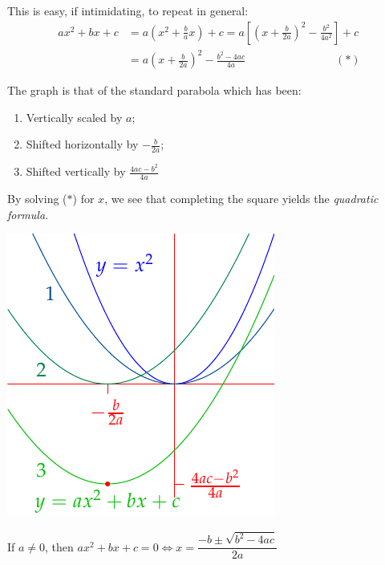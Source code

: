 This is easy, if intimidating, to repeat in general:
\begin{align*}
	ax^2+bx+c&=a\left(x^2+\frac ba x\right)+c =a\left[\left(x+\frac b{2a}\right)^2-\frac{b^2}{4a^2}\right]+c\\
	&=a\left(x+\frac b{2a}\right)^2-\frac{b^2-4ac}{4a} \qquad\qquad\qquad\qquad(\ast)
\end{align*}
\begin{minipage}[t]{0.6\linewidth}\vspace{0pt}
	The graph is that of the standard parabola which has been:
	\begin{enumerate}\itemsep0pt
	  \item Vertically scaled by $a$;
	  \item Shifted horizontally by $-\frac b{2a}$;
	  \item Shifted vertically by $\frac{4ac-b^2}{4a}$
	\end{enumerate}
	By solving ($\ast$) for $x$, we see that completing the square yields the \emph{quadratic formula.}
\end{minipage}
\hfill
\begin{minipage}[t]{0.39\linewidth}\vspace{-60pt}
	\flushright
	\includegraphics[scale=0.9]{poly-quad}
\end{minipage}

\begin{thm}{}{}
	If $a\neq 0$, then $ax^2+bx+c=0\iff x=\dfrac{-b\pm\sqrt{b^2-4ac}}{2a}$
\end{thm}


\goodbreak


